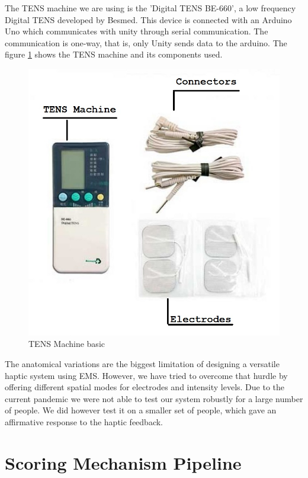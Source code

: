 The TENS machine we are using is the 'Digital TENS BE-660', a low frequency Digital TENS developed by Besmed. This device is connected with an Arduino Uno which communicates with unity through serial communication. The communication is one-way, that is, only Unity sends data to the arduino. The figure \ref{fig:besmed} shows the TENS machine and its components used.

\begin{figure}
    \centering
    \includegraphics[scale=.5]{images/Besmed1.jpg}
    \caption{TENS Machine basic}
    \label{fig:besmed}
\end{figure}

The anatomical variations are the biggest limitation of designing a versatile haptic system using EMS. However, we have tried to overcome that hurdle by offering different spatial modes for electrodes and intensity levels. Due to the current pandemic we were not able to test our system robustly for a large number of people. We did however test it on a smaller set of people, which gave an affirmative response to the haptic feedback. 

\section{Scoring Mechanism Pipeline}

